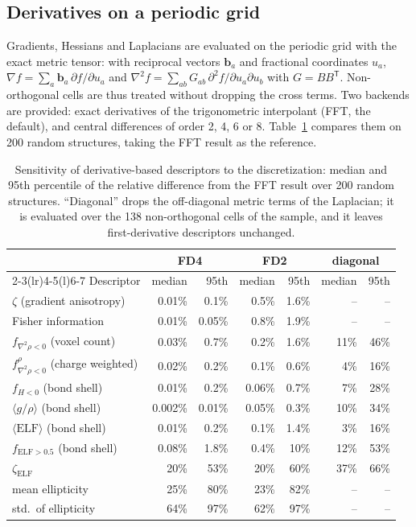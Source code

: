 \documentclass[11pt,a4paper]{article}
\begin{document}
\subsection{Derivatives on a periodic grid}
\label{sec:numerics:derivatives}

Gradients, Hessians and Laplacians are evaluated on the periodic grid with the
exact metric tensor: with reciprocal vectors $\mathbf{b}_a$ and fractional
coordinates $u_a$, $\nabla f=\sum_a\mathbf{b}_a\,\partial f/\partial u_a$ and
$\nabla^2 f=\sum_{ab}G_{ab}\,\partial^2 f/\partial u_a\partial u_b$ with
$G=BB^{\mathsf T}$. Non-orthogonal cells are thus treated without dropping the
cross terms. Two backends are provided: exact derivatives of the trigonometric
interpolant (FFT, the default), and central differences of order 2, 4, 6 or 8.
Table~\ref{tab:derivatives} compares them on 200 random structures, taking the
FFT result as the reference.

\begin{table}[htbp]
\centering
\caption{Sensitivity of derivative-based descriptors to the discretization:
median and 95th percentile of the relative difference from the FFT result
over 200 random structures. ``Diagonal'' drops the off-diagonal metric terms
of the Laplacian; it is evaluated over the 138 non-orthogonal cells of the
sample, and it leaves first-derivative descriptors unchanged.}
\label{tab:derivatives}
\begin{tabular}{lrrrrrr}
\toprule
 & \multicolumn{2}{c}{FD4} & \multicolumn{2}{c}{FD2} & \multicolumn{2}{c}{diagonal} \\
\cmidrule(lr){2-3}\cmidrule(lr){4-5}\cmidrule(l){6-7}
Descriptor & median & 95th & median & 95th & median & 95th \\
\midrule
$\zeta$ (gradient anisotropy) & 0.01\% & 0.1\% & 0.5\% & 1.6\% & -- & -- \\
Fisher information & 0.01\% & 0.05\% & 0.8\% & 1.9\% & -- & -- \\
$f_{\nabla^2\rho<0}$ (voxel count) & 0.03\% & 0.7\% & 0.2\% & 1.6\% & 11\% & 46\% \\
$f^{\rho}_{\nabla^2\rho<0}$ (charge weighted) & 0.02\% & 0.2\% & 0.1\% & 0.6\% & 4\% & 16\% \\
$f_{H<0}$ (bond shell) & 0.01\% & 0.2\% & 0.06\% & 0.7\% & 7\% & 28\% \\
$\langle g/\rho\rangle$ (bond shell) & 0.002\% & 0.01\% & 0.05\% & 0.3\% & 10\% & 34\% \\
$\langle\mathrm{ELF}\rangle$ (bond shell) & 0.01\% & 0.2\% & 0.1\% & 1.4\% & 3\% & 16\% \\
$f_{\mathrm{ELF}>0.5}$ (bond shell) & 0.08\% & 1.8\% & 0.4\% & 10\% & 12\% & 53\% \\
$\zeta_{\mathrm{ELF}}$ & 20\% & 53\% & 20\% & 60\% & 37\% & 66\% \\
mean ellipticity & 25\% & 80\% & 23\% & 82\% & -- & -- \\
std.\ of ellipticity & 64\% & 97\% & 62\% & 97\% & -- & -- \\
\bottomrule
\end{tabular}
\end{table}
\end{document}
